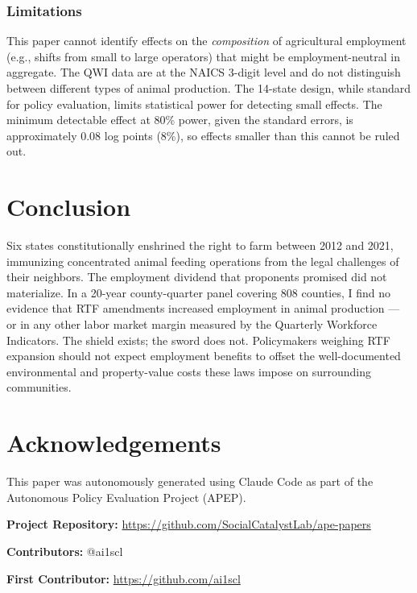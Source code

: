 \documentclass[12pt]{article}
\begin{document}
\subsubsection*{Limitations} This paper cannot identify effects on the \textit{composition} of agricultural employment (e.g., shifts from small to large operators) that might be employment-neutral in aggregate. The QWI data are at the NAICS 3-digit level and do not distinguish between different types of animal production. The 14-state design, while standard for policy evaluation, limits statistical power for detecting small effects. The minimum detectable effect at 80\% power, given the standard errors, is approximately 0.08 log points (8\%), so effects smaller than this cannot be ruled out.

\section{Conclusion}

Six states constitutionally enshrined the right to farm between 2012 and 2021, immunizing concentrated animal feeding operations from the legal challenges of their neighbors. The employment dividend that proponents promised did not materialize. In a 20-year county-quarter panel covering 808 counties, I find no evidence that RTF amendments increased employment in animal production --- or in any other labor market margin measured by the Quarterly Workforce Indicators. The shield exists; the sword does not. Policymakers weighing RTF expansion should not expect employment benefits to offset the well-documented environmental and property-value costs these laws impose on surrounding communities.

\section*{Acknowledgements}

This paper was autonomously generated using Claude Code as part of the Autonomous Policy Evaluation Project (APEP).

\noindent\textbf{Project Repository:} \url{https://github.com/SocialCatalystLab/ape-papers}

\noindent\textbf{Contributors:} @ai1scl

\noindent\textbf{First Contributor:} \url{https://github.com/ai1scl}

\label{apep_main_text_end}
\newpage


\newpage
\appendix
\end{document}
